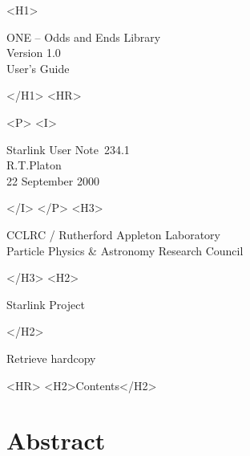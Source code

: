 \documentclass[twoside,11pt]{article}
\newcommand{\stardoccategory}  {Starlink User Note}
\newcommand{\stardocsource}    {sun\stardocnumber}
\newcommand{\stardocnumber}    {234.1}
\newcommand{\stardocauthors}   {R.T.Platon}
\newcommand{\stardocdate}      {22 September 2000}
\newcommand{\stardoctitle}     {ONE -- Odds and Ends Library}
\newcommand{\stardocversion}   {Version 1.0}
\newcommand{\stardocmanual}    {User's Guide}
\newcommand{\htmladdnormallink}[2]{#1}
\newcommand{\htmladdimg}[1]{}
\newcommand{\htmlref}[2]{#1}
\newcommand{\htmladdtonavigation}[1]{}
\newcommand{\xlabel}[1]{}
\renewcommand{\_}{\texttt{\symbol{95}}}
\begin{document}
\begin{htmlonly}
   \xlabel{}
   \begin{rawhtml} <H1> \end{rawhtml}
      \stardoctitle\\
      \stardocversion\\
      \stardocmanual
   \begin{rawhtml} </H1> <HR> \end{rawhtml}


   \begin{rawhtml} <P> <I> \end{rawhtml}
   \stardoccategory\ \stardocnumber \\
   \stardocauthors \\
   \stardocdate
   \begin{rawhtml} </I> </P> <H3> \end{rawhtml}
      \htmladdnormallink{CCLRC / Rutherford Appleton Laboratory}
                        {http://www.cclrc.ac.uk} \\
      \htmladdnormallink{Particle Physics \& Astronomy Research Council}
                        {http://www.pparc.ac.uk} \\
   \begin{rawhtml} </H3> <H2> \end{rawhtml}
      \htmladdnormallink{Starlink Project}{http://www.starlink.rl.ac.uk/}
   \begin{rawhtml} </H2> \end{rawhtml}
   \htmladdnormallink{\htmladdimg{source.gif} Retrieve hardcopy}
      {http://www.starlink.rl.ac.uk/cgi-bin/hcserver?\stardocsource}\\

  \label{stardoccontents}
  \begin{rawhtml} 
    <HR>
    <H2>Contents</H2>
  \end{rawhtml}
  \htmladdtonavigation{\htmlref{\htmladdimg{contents_motif.gif}}
        {stardoccontents}}

  \section{\xlabel{abstract}Abstract}
\end{htmlonly}
\end{document}

